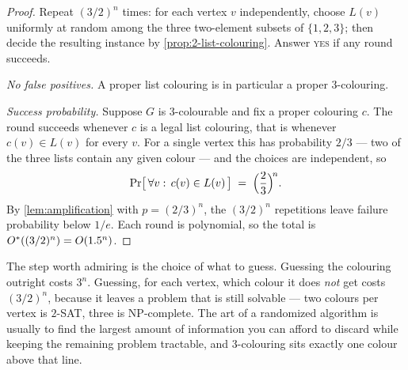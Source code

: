 \begin{proof}
Repeat $(3/2)^n$ times: for each vertex $v$ independently, choose $L(v)$
uniformly at random among the three two-element subsets of $\{1,2,3\}$; then
decide the resulting  instance by
\cref{prop:2-list-colouring}. Answer \textsc{yes} if any round succeeds.

\emph{No false positives.} A proper list colouring is in particular a proper
$3$-colouring.

\emph{Success probability.} Suppose $G$ is $3$-colourable and fix a proper
colouring $c$. The round succeeds whenever $c$ is a legal list colouring, that
is whenever $c(v) \in L(v)$ for every $v$. For a single vertex this has
probability $2/3$ --- two of the three lists contain any given colour --- and
the choices are independent, so
\[ \Pr\bigl[\,\forall v:\, c(v) \in L(v)\,\bigr] \;=\;
   \Bigl(\frac23\Bigr)^{\! n}. \]
By \cref{lem:amplification} with $p = (2/3)^n$, the $(3/2)^n$ repetitions leave
failure probability below $1/e$. Each round is polynomial, so the total is
$O^{*}((3/2)^n) = O\!\left(1.5^n\right)$.
\end{proof}

\begin{intuition}
The step worth admiring is the choice of what to guess. Guessing the colouring
outright costs $3^n$. Guessing, for each vertex, which colour it does
\emph{not} get costs $(3/2)^n$, because it leaves a problem that is still
solvable --- two colours per vertex is $2$-SAT, three is
\textrm{NP}-complete. The art of a randomized algorithm is usually to find the
largest amount of information you can afford to discard while keeping the
remaining problem tractable, and $3$-colouring sits exactly one colour above
that line.
\end{intuition}

